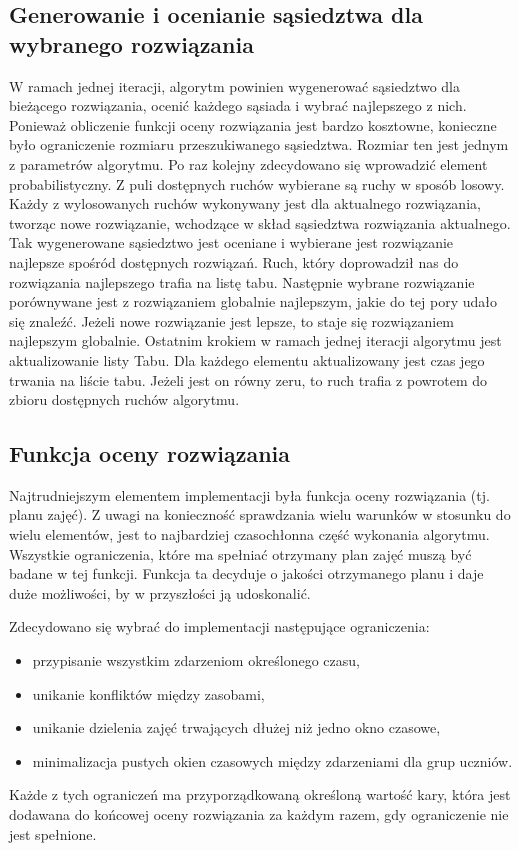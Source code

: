 \subsection{Generowanie i ocenianie sąsiedztwa dla wybranego rozwiązania}

W ramach jednej iteracji, algorytm powinien wygenerować sąsiedztwo dla bieżącego rozwiązania, ocenić każdego sąsiada i wybrać najlepszego z nich. Ponieważ obliczenie funkcji oceny rozwiązania jest bardzo kosztowne, konieczne było ograniczenie rozmiaru przeszukiwanego sąsiedztwa. Rozmiar ten jest jednym z parametrów algorytmu. Po raz kolejny zdecydowano się wprowadzić element probabilistyczny. Z puli dostępnych ruchów wybierane są ruchy w sposób losowy. Każdy z wylosowanych ruchów wykonywany jest dla aktualnego rozwiązania, tworząc nowe rozwiązanie, wchodzące w skład sąsiedztwa rozwiązania aktualnego. Tak wygenerowane sąsiedztwo jest oceniane i wybierane jest rozwiązanie najlepsze spośród dostępnych rozwiązań. Ruch, który doprowadził nas do rozwiązania najlepszego trafia na listę tabu. Następnie wybrane rozwiązanie porównywane jest z rozwiązaniem globalnie najlepszym, jakie do tej pory udało się znaleźć. Jeżeli nowe rozwiązanie jest lepsze, to staje się rozwiązaniem najlepszym globalnie. Ostatnim krokiem w ramach jednej iteracji algorytmu jest aktualizowanie listy Tabu. Dla każdego elementu aktualizowany jest czas jego trwania na liście tabu. Jeżeli jest on równy zeru, to ruch trafia z powrotem do zbioru dostępnych ruchów algorytmu.

\subsection{Funkcja oceny rozwiązania}

Najtrudniejszym elementem implementacji była funkcja oceny rozwiązania (tj. planu zajęć). Z uwagi na konieczność sprawdzania wielu warunków w stosunku do wielu elementów, jest to najbardziej czasochłonna część wykonania algorytmu. Wszystkie ograniczenia, które ma spełniać otrzymany plan zajęć muszą być badane w tej funkcji. Funkcja ta decyduje o jakości otrzymanego planu i daje duże możliwości, by w przyszłości ją udoskonalić.

Zdecydowano się wybrać do implementacji następujące ograniczenia:
\begin{itemize}
\item przypisanie wszystkim zdarzeniom określonego czasu,
\item unikanie konfliktów między zasobami,
\item unikanie dzielenia zajęć trwających dłużej niż jedno okno czasowe,
\item minimalizacja pustych okien czasowych między zdarzeniami dla grup uczniów.
\end{itemize} Każde z tych ograniczeń ma przyporządkowaną określoną wartość kary, która jest dodawana do końcowej oceny rozwiązania za każdym razem, gdy ograniczenie nie jest spełnione.

